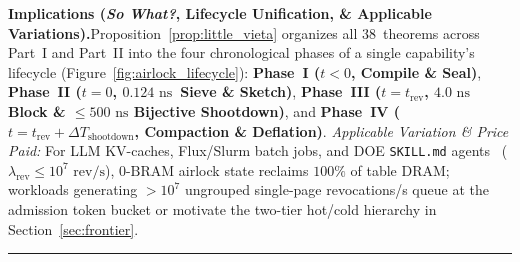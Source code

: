 \documentclass[10pt,twocolumn]{article}
\newcommand{\MidConnesRule}{%
  \par\vspace{4pt}\noindent\textcolor{black!25}{\rule{\textwidth}{0.4pt}}\par\vspace{4pt}%
}
\providecommand{\LeanCumulativeTotal}{38}
\providecommand{\StageOneNs}{\ensuremath{0.124\text{~ns}}}
\theoremstyle{spectralthm}
\begin{document}
\noindent\textbf{Implications (\emph{So What?}, Lifecycle Unification, \& Applicable Variations).}\;Proposition~\ref{prop:little_vieta} organizes all \LeanCumulativeTotal\ theorems across Part~I and Part~II into the four chronological phases of a single capability's lifecycle (Figure~\ref{fig:airlock_lifecycle}): \textbf{Phase~I ($t<0$, Compile \& Seal)}, \textbf{Phase~II ($t=0$, \StageOneNs\ Sieve \& Sketch)}, \textbf{Phase~III ($t=t_{\mathrm{rev}}$, $4.0\text{~ns}$ Block \& $\le 500\text{~ns}$ Bijective Shootdown)}, and \textbf{Phase~IV ($t=t_{\mathrm{rev}}+\Delta T_{\mathrm{shootdown}}$, Compaction \& Deflation)}. \emph{Applicable Variation \& Price Paid:} For LLM KV-caches, Flux/Slurm batch jobs, and DOE \texttt{SKILL.md} agents~\cite{doe2025genesis} ($\lambda_{\mathrm{rev}} \le 10^7\text{~rev/s}$), $0\text{-BRAM}$ airlock state reclaims $100\%$ of table DRAM; workloads generating $>10^7$ ungrouped single-page revocations/s queue at the admission token bucket or motivate the two-tier hot/cold hierarchy in Section~\ref{sec:frontier}.
\MidConnesRule
\end{document}
